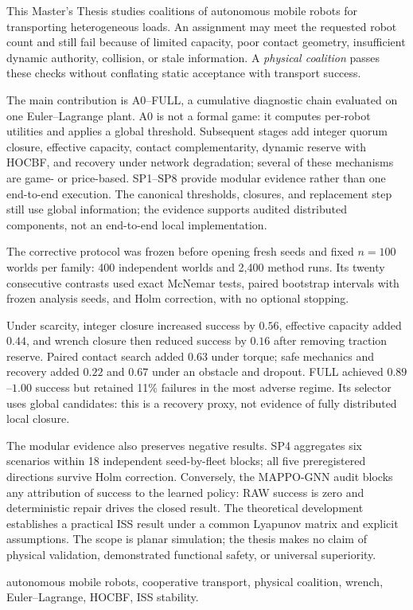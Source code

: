 \thispagestyle{frontmatter}
{}
\par
\vspace{0.8em}

This Master's Thesis studies coalitions of autonomous mobile robots for transporting heterogeneous loads. An assignment may meet the requested robot count and still fail because of limited capacity, poor contact geometry, insufficient dynamic authority, collision, or stale information. A \emph{physical coalition} passes these checks without conflating static acceptance with transport success.

The main contribution is A0--FULL, a cumulative diagnostic chain evaluated on one Euler--Lagrange plant. A0 is not a formal game: it computes per-robot utilities and applies a global threshold. Subsequent stages add integer quorum closure, effective capacity, contact complementarity, dynamic reserve with HOCBF, and recovery under network degradation; several of these mechanisms are game- or price-based. SP1--SP8 provide modular evidence rather than one end-to-end execution. The canonical thresholds, closures, and replacement step still use global information; the evidence supports audited distributed components, not an end-to-end local implementation.

The corrective protocol was frozen before opening fresh seeds and fixed $n=100$ worlds per family: 400 independent worlds and 2,400 method runs. Its twenty consecutive contrasts used exact McNemar tests, paired bootstrap intervals with frozen analysis seeds, and Holm correction, with no optional stopping.

Under scarcity, integer closure increased success by $0.56$, effective capacity added $0.44$, and wrench closure then reduced success by $0.16$ after removing traction reserve. Paired contact search added $0.63$ under torque; safe mechanics and recovery added $0.22$ and $0.67$ under an obstacle and dropout. FULL achieved $0.89$--$1.00$ success but retained 11\% failures in the most adverse regime. Its selector uses global candidates: this is a recovery proxy, not evidence of fully distributed local closure.

The modular evidence also preserves negative results. SP4 aggregates six scenarios within 18 independent seed-by-fleet blocks; all five preregistered directions survive Holm correction. Conversely, the MAPPO-GNN audit blocks any attribution of success to the learned policy: RAW success is zero and deterministic repair drives the closed result. The theoretical development establishes a practical ISS result under a common Lyapunov matrix and explicit assumptions. The scope is planar simulation; the thesis makes no claim of physical validation, demonstrated functional safety, or universal superiority.

\vspace{0.8em}
\enspace autonomous mobile robots, cooperative transport, physical coalition, wrench, Euler--Lagrange, HOCBF, ISS stability.

\clearpage
